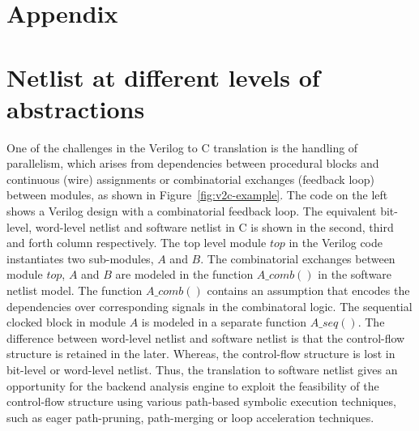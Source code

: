 \section {Appendix}

\section {Netlist at different levels of abstractions}
One of the challenges in the Verilog to C translation is the handling of 
parallelism, which arises from dependencies between procedural blocks 
and continuous (wire) assignments or combinatorial exchanges (feedback loop) 
between modules, as shown in Figure~\ref{fig:v2c-example}. 
The code on the left shows a Verilog design with a combinatorial 
feedback loop. The equivalent bit-level, word-level netlist and software netlist 
in C is shown in the second, third and forth column respectively.
The top level module $\mathit{top}$ in the Verilog code instantiates two sub-modules, $A$ and $B$. 
The combinatorial exchanges between module $\mathit{top}$, $A$ and $B$ are modeled in the 
function $A\_comb()$ in the software netlist model. The function $A\_comb()$ contains
an assumption that encodes the dependencies over corresponding signals in the 
combinatoral logic. The sequential clocked block in module $A$ is modeled in a separate 
function $A\_seq()$. The difference between word-level 
netlist and software netlist is that the control-flow 
structure is retained in the later. Whereas, the control-flow structure 
is lost in bit-level or word-level netlist. Thus, the translation 
to software netlist gives an opportunity for the backend analysis engine to 
exploit the feasibility of the control-flow structure using various 
path-based symbolic execution techniques, such as eager path-pruning, 
path-merging or loop acceleration techniques.  

